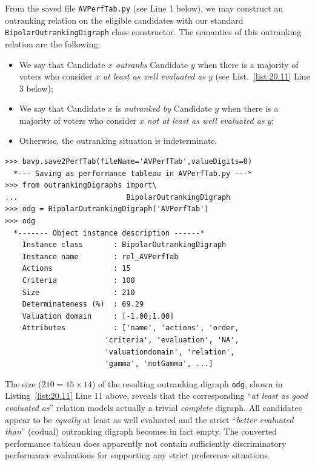 From the saved file \texttt{AVPerfTab.py} (see Line 1 below), we may construct an outranking relation on the eligible candidates with our standard \texttt{BipolarOutran\-kingDigraph} class constructor. The semantics of this outranking relation are the following:
\begin{itemize}[nosep,leftmargin=0.5cm,rightmargin=0.5cm]
\item We say that Candidate $x$ \emph{outranks} Candidate $y$ when there is a majority of voters who consider $x$ \emph{at least as well evaluated as} $y$ (see List.~\vref{list:20.11} Line 3 below);
\item We say that Candidate $x$ is \emph{outranked by} Candidate $y$ when there is a majority of voters who consider $x$ \emph{not at least as well evaluated as} $y$;
\item Otherwise, the outranking situation is indeterminate.
\end{itemize}
\begin{lstlisting}[caption={Computing the outranking digraph},label=list:20.11]
>>> bavp.save2PerfTab(fileName='AVPerfTab',valueDigits=0)
  *--- Saving as performance tableau in AVPerfTab.py ---*
>>> from outrankingDigraphs import\
...                         BipolarOutrankingDigraph
>>> odg = BipolarOutrankingDigraph('AVPerfTab')
>>> odg
  *------- Object instance description ------*
    Instance class       : BipolarOutrankingDigraph
    Instance name        : rel_AVPerfTab
    Actions              : 15
    Criteria             : 100
    Size                 : 210
    Determinateness (%)  : 69.29
    Valuation domain     : [-1.00;1.00]
    Attributes           : ['name', 'actions', 'order,
                       'criteria', 'evaluation', 'NA',
                       'valuationdomain', 'relation',
                       'gamma', 'notGamma', ...]
\end{lstlisting}

The size ($210 = 15 \times 14$) of the resulting outranking digraph \texttt{odg}, shown in Listing~\vref{list:20.11} Line 11 above, reveals that the corresponding ``\emph{at least as good evaluated as}'' relation models actually a trivial \emph{complete} digraph. All candidates appear to be \emph{equally} at least as well evaluated and the strict ``\emph{better evaluated than}'' (codual) outranking digraph becomes in fact empty. The converted performance tableau does apparently not contain sufficiently discriminatory performance evaluations for supporting any strict preference situations.

